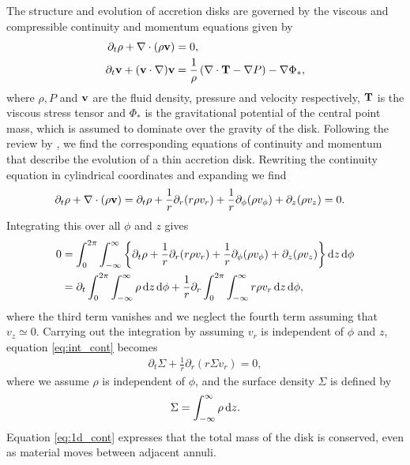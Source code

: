 The structure and evolution of accretion disks are governed by the viscous and compressible continuity and momentum equations given by \citep[eg.][]{landau1959}
\begin{align}
    \partial_t \rho + \nabla \cdot (\rho \mathbf{v}) &= 0, \label{eq:fluid_cont} \\
    \partial_t \mathbf{v} + (\mathbf{v} \cdot \nabla) \mathbf{v} &= \frac{1}{\rho} \left( \nabla \cdot \mathbf{T} - \nabla P  \right) - \nabla \Phi_*, \label{eq:fluid_mom}
\end{align}
where $\rho, P$ and $\mathbf{v}$ are the fluid density, pressure and velocity respectively, $\mathbf{T}$ is the viscous stress tensor and $\Phi_*$ is the gravitational potential of the central point mass, which is assumed to dominate over the gravity of the disk. 
Following the review by \citet{papaloizou1995}, we find the corresponding equations of continuity and momentum that describe the evolution of a thin accretion disk.
Rewriting the continuity equation in cylindrical coordinates and expanding we find
\begin{align}
    \partial_t \rho + \nabla \cdot (\rho \mathbf{v}) &= \partial_t \rho + \frac{1}{r} \partial_r (r \rho v_r) + \frac{1}{r} \partial_\phi (\rho v_\phi) + \partial_z (\rho v_z) = 0.
\end{align}
Integrating this over all $\phi$ and $z$ gives
\begin{align}
    0 &= \int_0^{2\pi} \int_{-\infty}^\infty \left\{ \partial_t \rho + \frac{1}{r} \partial_r (r \rho v_r) + \frac{1}{r} \partial_\phi (\rho v_\phi) + \partial_z (\rho v_z) \right\} \mathop{}\!\mathrm{d}{z} \mathop{}\!\mathrm{d}{\phi} \\
    &= \partial_t \int_0^{2\pi} \int_{-\infty}^\infty \rho \mathop{}\!\mathrm{d}{z} \mathop{}\!\mathrm{d}{\phi} + \frac{1}{r} \partial_r \int_0^{2\pi} \int_{-\infty}^\infty r \rho v_r \mathop{}\!\mathrm{d}{z} \mathop{}\!\mathrm{d}{\phi}, \label{eq:int_cont}
\end{align}
where the third term vanishes and we neglect the fourth term assuming that $v_z \simeq 0$.
Carrying out the integration by assuming $v_r$ is independent of $\phi$ and $z$, equation \ref{eq:int_cont} becomes
\begin{align}
    \partial_t \Sigma + \frac{1}{r} \partial_r (r \Sigma v_r) = 0, \label{eq:1d_cont}
\end{align}
where we assume $\rho$ is independent of $\phi$, and the surface density $\Sigma$ is defined by 
\begin{align}
    \Sigma = \int_{-\infty}^\infty \rho \mathop{}\!\mathrm{d}{z}.
\end{align} 
Equation \ref{eq:1d_cont} expresses that the total mass of the disk is conserved, even as material moves between adjacent annuli. 


